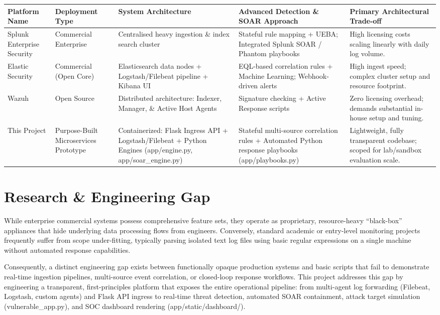 \begin{table}[htbp]
\centering
\begin{tabular}{|P{3cm}|P{5cm}|P{5cm}|P{5cm}|P{5cm}|}
\hline
Platform Name & Deployment Type & System Architecture & Advanced Detection \& SOAR Approach & Primary Architectural Trade-off \\ \hline
Splunk Enterprise Security & Commercial Enterprise & Centralised heavy ingestion \& index search cluster & Stateful rule mapping + UEBA; Integrated Splunk SOAR / Phantom playbooks & High licensing costs scaling linearly with daily log volume. \\ \hline
Elastic Security & Commercial (Open Core) & Elasticsearch data nodes + Logstash/Filebeat pipeline + Kibana UI & EQL-based correlation rules + Machine Learning; Webhook-driven alerts & High ingest speed; complex cluster setup and resource footprint. \\ \hline
Wazuh & Open Source & Distributed architecture: Indexer, Manager, \& Active Host Agents & Signature checking + Active Response scripts & Zero licensing overhead; demands substantial in-house setup and tuning. \\ \hline
This Project & Purpose-Built Microservices Prototype & Containerized: Flask Ingress API + Logstash/Filebeat + Python Engines (app/engine.py, app/soar\_engine.py) & Stateful multi-source correlation rules + Automated Python response playbooks (app/playbooks.py) & Lightweight, fully transparent codebase; scoped for lab/sandbox evaluation scale. \\ \hline
\end{tabular}
\end{table}

\section{Research \& Engineering Gap}

While enterprise commercial systems possess comprehensive feature sets, they operate as proprietary, resource-heavy ``black-box'' appliances that hide underlying data processing flows from engineers. Conversely, standard academic or entry-level monitoring projects frequently suffer from scope under-fitting, typically parsing isolated text log files using basic regular expressions on a single machine without automated response capabilities.

Consequently, a distinct engineering gap exists between functionally opaque production systems and basic scripts that fail to demonstrate real-time ingestion pipelines, multi-source event correlation, or closed-loop response workflows. This project addresses this gap by engineering a transparent, first-principles platform that exposes the entire operational pipeline: from multi-agent log forwarding (Filebeat, Logstash, custom agents) and Flask API ingress to real-time threat detection, automated SOAR containment, attack target simulation (vulnerable\_app.py), and SOC dashboard rendering (app/static/dashboard/).

